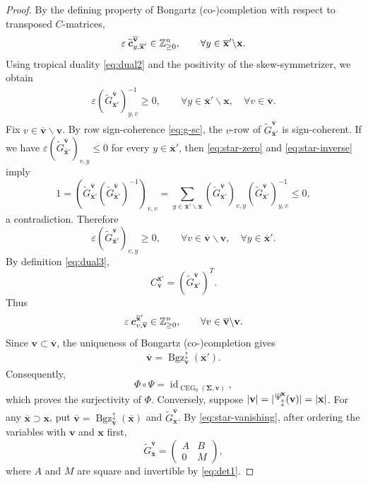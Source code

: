 \documentclass[11pt,reqno]{amsart}
\newcommand{\Neptune}{\mathord{\text{\tikz[baseline=-.5ex,scale=.13]{\draw[line width=.45pt] (0,0)--(0,1.8) (-.6,1.8)--(-.6,.8)--(.6,.8)--(.6,1.8) (-.35,.35)--(.35,.35);}}}}
\theoremstyle{plain}
\theoremstyle{definition}
\numberwithin{equation}{section}
\newcommand\ZZ{\mathbb{Z}}
\newcommand\<{\langle}
\renewcommand\>{\rangle}
\newcommand{\id}{\operatorname{id}}
\newcommand{\CEG}{\operatorname{CEG}} %
\def\vv{\mathbf{v}}
\newcommand{\bfit}[1]{\textbf{\textit{#1}}}
\def\seeds{\mathbf{\Sigma}}
\def\xx{\mathbf{x}}%
\def\cvec{\bfit{c}}
\def\Cmat{{C}}
\def\Gmat{{G}}
\newcommand{\Bgzpm}[2]{\operatorname{Bgz}^{\updownarrow}_{#2}(#1)}
\newcommand{\suppdu}[1]{\operatorname{\Neptune}_{\updownarrow}^{#1}}
\newcommand{\ol}[1]{\overline{#1}}
\def\ZZp{\ZZ_{\ge0}}
\begin{document}
\begin{proof}
By the defining property of Bongartz
(co-)completion with respect to transposed $C$-matrices,
\[
    \varepsilon\,
    \widetilde{\cvec}^{\ol{\vv}}_{y,\ol{\xx}'}
    \in\ZZp^n,
    \qquad
    \forall y\in\ol{\xx}'\backslash\xx.
\]
Using tropical duality \eqref{eq:dual2} and the positivity of the skew-symmetrizer, we obtain
\begin{gather}\label{eq:star-inverse}
    \varepsilon(\widetilde{\Gmat}^{\ol{\vv}}_{\ol{\xx}'})^{-1}_{y,v}\ge0,
    \qquad
    \forall y\in\ol{\xx}'\backslash\xx,\quad
    \forall v\in\ol{\vv}.
\end{gather}
Fix $v\in\ol{\vv}\backslash\vv$.
By row sign-coherence \eqref{eq:g-sc}, the $v$-row of $\widetilde{\Gmat}^{\ol{\vv}}_{\ol{\xx}'}$ is sign-coherent.
If we have $\varepsilon (\widetilde{\Gmat}^{\ol{\vv}}_{\ol{\xx}'})_{v,y}\le0$ for every $y\in\ol{\xx}'$, then
\eqref{eq:star-zero} and \eqref{eq:star-inverse} imply
\[
    1=\left(\widetilde{\Gmat}^{\ol{\vv}}_{\ol{\xx}'}(\widetilde{\Gmat}^{\ol{\vv}}_{\ol{\xx}'})^{-1}\right)_{v,v}
     =\sum_{y\in\ol{\xx}'\backslash\xx}
       (\widetilde{\Gmat}^{\ol{\vv}}_{\ol{\xx}'})_{v,y}(\widetilde{\Gmat}^{\ol{\vv}}_{\ol{\xx}'})^{-1}_{y,v}
     \le0,
\]
a contradiction. Therefore
\[
    \varepsilon (\widetilde{\Gmat}^{\ol{\vv}}_{\ol{\xx}'})_{v,y}\ge0,
    \qquad
    \forall v\in\ol{\vv}\backslash\vv,\quad
    \forall y\in\ol{\xx}'.
\]
By definition \eqref{eq:dual3},
\[
    \Cmat^{\ol{\xx}'}_{\ol{\vv}}=(\widetilde{\Gmat}^{\ol{\vv}}_{\ol{\xx}'})^T.
\]
Thus
\[
    \varepsilon\,
    \cvec^{\ol{\xx}'}_{v,\ol{\vv}}
    \in\ZZp^n,
    \qquad
    \forall v\in\ol{\vv}\backslash\vv.
\]
Since $\vv\subset\ol{\vv}$, the uniqueness
of Bongartz (co-)completion gives
\begin{gather}\label{eq:star-bongartz-u}
    \ol{\vv}=\Bgzpm{\ol{\xx}'}{\vv}.
\end{gather}
Consequently,
\[
    \Phi\circ\Psi
    =\id_{\CEG_0(\seeds,\vv)},
\]
which proves the surjectivity of $\Phi$.
Conversely, suppose $|\vv|=|\suppdu{\xx}(\vv)|=|\xx|$.
For any $\ol{\xx}\supset\xx$, put
$\ol{\vv}=\Bgzpm{\ol{\xx}}{\vv}$ and
$\widetilde{\Gmat}^{\ol{\vv}}_{\ol{\xx}}$.
By \eqref{eq:star-vanishing}, after ordering
the variables with $\vv$ and $\xx$ first,
\[
    \widetilde{\Gmat}^{\ol{\vv}}_{\ol{\xx}}=
    \begin{pmatrix}
        A&B\\
        0&M
    \end{pmatrix},
\]
where $A$ and $M$ are square and invertible
by \eqref{eq:det1}.


\end{proof}
\end{document}
